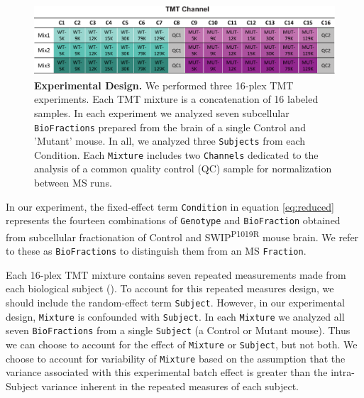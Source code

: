 \documentclass[12pt]{elife}\usepackage[]{graphicx}\usepackage[]{color}
\begin{document}
\begin{figure}[h] %
  \begin{fullwidth}
  \begin{center}
	  \includegraphics[width=0.9\paperwidth,keepaspectratio]{design}
	  \caption{\textbf{Experimental Design.} We performed three 16-plex TMT
	  experiments. Each TMT mixture is a concatenation of 16 labeled
	  samples. In each experiment we analyzed seven subcellular
	  \texttt{BioFractions} prepared from the brain of a single Control
	  and 'Mutant' mouse. In all, we analyzed three \texttt{Subjects} from 
	  each {Condition}. Each \texttt{Mixture} includes two \texttt{Channels}
	  dedicated to the analysis of a common quality control (QC) sample for
	  normalization between MS runs.}
	  \label{fig:design}
  \end{center}
  \end{fullwidth}
\end{figure}

In our experiment, the fixed-effect term \texttt{Condition} in equation
\ref{eq:reduced} represents the fourteen combinations of \texttt{Genotype} and
\texttt{BioFraction} obtained from subcellular fractionation of Control and
SWIP\textsuperscript{P1019R} mouse brain. We refer to these as
\texttt{BioFractions} to distinguish them from an MS \texttt{Fraction}. 

Each 16-plex TMT mixture contains seven repeated measurements made from each
biological subject ().  To account for this repeated measures
design, we should include the random-effect term \texttt{Subject}.  However, in
our experimental design, \texttt{Mixture} is confounded with \texttt{Subject}.
In each \texttt{Mixture} we analyzed all seven \texttt{BioFractions} from a
single \texttt{Subject} (a Control or Mutant mouse). Thus we can choose to
account for the effect of \texttt{Mixture} or \texttt{Subject}, but not both. We
choose to account for variability of \texttt{Mixture} based on the assumption
that the variance associated with this experimental batch effect is greater than
the intra-Subject variance inherent in the repeated measures of each subject.\\
\end{document}
